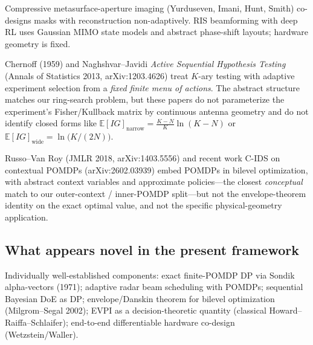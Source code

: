 \documentclass[11pt,a4paper]{article}
\newcommand{\E}{\mathbb{E}}
\begin{document}
\begin{description}[leftmargin=2em, style=nextline]
\item[Programmable metasurfaces / RIS.]
Compressive metasurface-aperture imaging (Yurduseven, Imani, Hunt, Smith) co-designs masks with reconstruction non-adaptively.  RIS beamforming with deep RL uses Gaussian MIMO state models and abstract phase-shift layouts; hardware geometry is fixed.

\item[Sequential hypothesis testing.]
Chernoff (1959) and Naghshvar--Javidi \emph{Active Sequential Hypothesis Testing} (Annals of Statistics 2013, arXiv:1203.4626) treat $K$-ary testing with adaptive experiment selection from a \emph{fixed finite menu of actions}.  The abstract structure matches our ring-search problem, but these papers do not parameterize the experiment's Fisher/Kullback matrix by continuous antenna geometry and do not identify closed forms like $\E[IG]_{\text{narrow}} = \frac{K-N}{K}\ln(K-N)$ or $\E[IG]_{\text{wide}} = \ln\bigl(K/(2N)\bigr)$.

\item[Information-directed sampling.]
Russo--Van Roy (JMLR 2018, arXiv:1403.5556) and recent work C-IDS on contextual POMDPs (arXiv:2602.03939) embed POMDPs in bilevel optimization, with abstract context variables and approximate policies---the closest \emph{conceptual} match to our outer-context / inner-POMDP split---but not the envelope-theorem identity on the exact optimal value, and not the specific physical-geometry application.
\end{description}

\subsection{What appears novel in the present framework}

Individually well-established components: exact finite-POMDP DP via Sondik alpha-vectors (1971); adaptive radar beam scheduling with POMDPs; sequential Bayesian DoE as DP; envelope/Danskin theorem for bilevel optimization (Milgrom--Segal 2002); EVPI as a decision-theoretic quantity (classical Howard--Raiffa--Schlaifer); end-to-end differentiable hardware co-design (Wetzstein/Waller).
\end{document}
